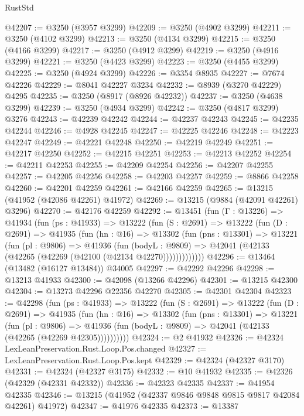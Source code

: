 \begin{lexlean}{RustStd}
\begin{coremodule}
@42207 := @3250 (@3957 @3299)
@42209 := @3250 (@4902 @3299)
@42211 := @3250 (@4102 @3299)
@42213 := @3250 (@4134 @3299)
@42215 := @3250 (@4166 @3299)
@42217 := @3250 (@4912 @3299)
@42219 := @3250 (@4916 @3299)
@42221 := @3250 (@4423 @3299)
@42223 := @3250 (@4455 @3299)
@42225 := @3250 (@4924 @3299)
@42226 := @3354 @8935
@42227 := @7674 @42226
@42229 := @8041 @42227 @3234
@42232 := @8939 (@3270 @42229) @4295
@42235 := @3250 (@8917 (@8926 @42232))
@42237 := @3250 (@4638 @3299)
@42239 := @3250 (@4934 @3299)
@42242 := @3250 (@4817 @3299) @3276
@42243 := @42239 @42242
@42244 := @42237 @42243
@42245 := @42235 @42244
@42246 := @4928 @42245
@42247 := @42225 @42246
@42248 := @42223 @42247
@42249 := @42221 @42248
@42250 := @42219 @42249
@42251 := @42217 @42250
@42252 := @42215 @42251
@42253 := @42213 @42252
@42254 := @42211 @42253
@42255 := @42209 @42254
@42256 := @42207 @42255
@42257 := @42205 @42256
@42258 := @42203 @42257
@42259 := @8866 @42258
@42260 := @42201 @42259
@42261 := @42166 @42259
@42265 := @13215 (@41952 (@42086 @42261) @41972)
@42269 := @13215 (@9884 (@42091 @42261) @3296)
@42270 := @42176 @42259
@42292 := @13451
    (fun (Γ : @13226) =>
    @41934
      (fun (ps : @41933) =>
      @13222
        (fun (S : @2691) =>
        @13222
          (fun (D : @2691) =>
          @41935
            (fun (hn : @16) =>
            @13302
              (fun (pns : @13301) =>
              @13221
                (fun (pl : @9806) =>
                @41936
                  (fun (bodyL : @9809) =>
                  @42041 (@42133 (@42265 (@42269 (@42100 (@42134 @42270)))))))))))))
@42296 := @13464 (@13482 (@16127 @13484)) @34005
@42297 := @42292 @42296
@42298 := @13213 @41933
@42300 := @42098 (@13266 @42296)
@42301 := @13215 @42300
@42304 := @13273 @42296 @22356 @42270
@42305 := @42301 @42304
@42323 := @42298
    (fun (ps : @41933) =>
    @13222
      (fun (S : @2691) =>
      @13222
        (fun (D : @2691) =>
        @41935
          (fun (hn : @16) =>
          @13302
            (fun (pns : @13301) =>
            @13221
              (fun (pl : @9806) =>
              @41936 (fun (bodyL : @9809) => @42041 (@42133 (@42265 (@42269 @42305))))))))))
@42324 := @2 @41932
@42326 := @42324 LexLeanPreservation.Rust.Loop.Pos.changed
@42327 := LexLeanPreservation.Rust.Loop.Pos.kept
@42329 := @42324 (@42327 @3170)
@42331 := @42324 (@42327 @3175)
@42332 := @10 @41932
@42335 := @42326 (@42329 (@42331 @42332))
@42336 := @42323 @42335
@42337 := @41954 @42335
@42346 := @13215 (@41952 (@42337 @9846 @9848 @9815 @9817 @42084 @42261) @41972)
@42347 := @41976 @42335
@42373 := @13387

\end{coremodule}
\end{lexlean}

